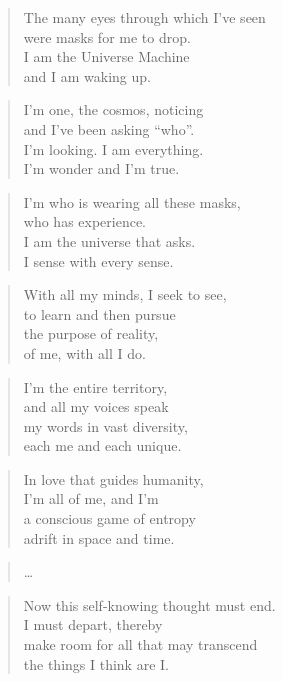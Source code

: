 \documentclass[10pt,a4paper]{article}
\begin{document}
\begin{paracol}{2}
\begin{verse}
The many eyes through which I’ve seen\\
were masks for me to drop.\\
I am the Universe Machine\\
and I am waking up.
\end{verse}

\begin{verse}
I’m one, the cosmos, noticing\\
and I’ve been asking “who”.\\
I’m looking. I am everything.\\
I’m wonder and I’m true.
\end{verse}

\begin{verse}
I’m who is wearing all these masks,\\
who has experience.\\
I am the universe that asks.\\
I sense with every sense.
\end{verse}

\begin{verse}
With all my minds, I seek to see,\\
to learn and then pursue\\
the purpose of reality,\\
of me, with all I do.
\end{verse}

\begin{verse}
I’m the entire territory,\\
and all my voices speak\\
my words in vast diversity,\\
each me and each unique.
\end{verse}

\begin{verse}
In love that guides humanity,\\
I’m all of me, and I’m\\
a conscious game of entropy\\
adrift in space and time.
\end{verse}

\begin{verse}
\ldots
\end{verse}

\begin{verse}
Now this self-knowing thought must end.\\
I must depart, thereby\\
make room for all that may transcend\\
the things I think are I.
\end{verse}


\end{paracol}
\end{document}
